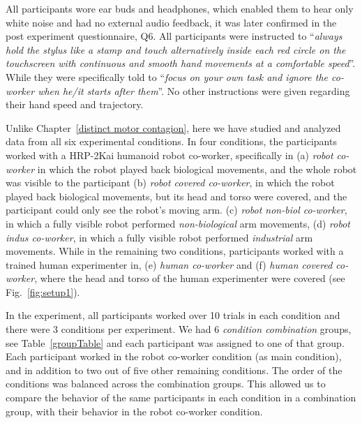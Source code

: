 All participants wore ear buds and headphones, which enabled them to hear only white noise and had no external audio feedback, it was later confirmed in the post experiment questionnaire, Q6. All participants were instructed to ``{\it always hold the stylus like a stamp and touch alternatively inside each red circle on the touchscreen with continuous and smooth hand movements at a comfortable speed}''. While they were specifically told to ``{\it focus on your own task and ignore the co-worker when he/it starts after them}''. No other instructions were given regarding their hand speed and trajectory.

Unlike Chapter~\ref{distinct motor contagion}, here we have studied and analyzed data from all six experimental conditions. In four conditions, the participants worked with a HRP-2Kai humanoid robot co-worker, specifically in (a) \textit{robot co-worker} in which the robot played back biological movements, and the whole robot was visible to the participant (b) \textit{robot covered co-worker}, in which the robot played back biological movements, but its head and torso were covered, and the participant could only see the robot's moving arm. (c) \textit{robot non-biol co-worker}, in which a fully visible robot performed \textit{non-biological} arm movements, (d) \textit{robot indus co-worker}, in which a fully visible robot performed \textit{industrial} arm movements. While in the remaining two conditions, participants worked with a trained human experimenter in, (e) \textit{human co-worker} and (f) \textit{human covered co-worker}, where the head and torso of the human experimenter were covered (see Fig.~\ref{fig:setup1}).

In the experiment, all participants worked over 10 trials in each condition and there were 3 conditions per experiment. We had 6 \emph{condition combination} groups, see Table~\ref{groupTable} and each participant was assigned to one of that group. Each participant worked in the robot co-worker condition (as main condition), and in addition to two out of five other remaining conditions. The order of the conditions was balanced across the combination groups. This allowed us to compare the behavior of the same participants in each condition in a combination group, with their behavior in the robot co-worker condition.



